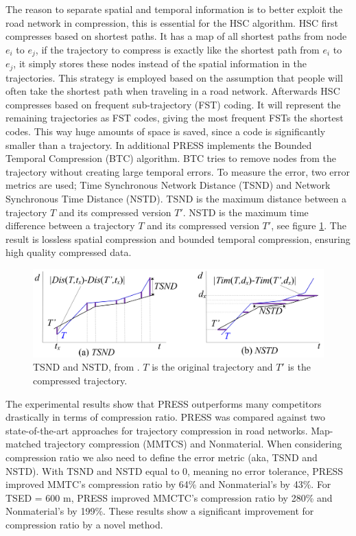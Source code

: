 The reason to separate spatial and temporal information is to better exploit the road network in compression, this is essential for the HSC algorithm. HSC first compresses based on shortest paths. It has a map of all shortest paths from node $e_i$ to $e_j$, if the trajectory to compress is exactly like the shortest path from $e_i$ to $e_j$, it simply stores these nodes instead of the spatial information in the trajectories. This strategy is employed based on the assumption that people will often take the shortest path when traveling in a road network. Afterwards HSC compresses based on frequent sub-trajectory (FST) coding. It will represent the remaining trajectories as FST codes, giving the most frequent FSTs the shortest codes. This way huge amounts of space is saved, since a code is significantly smaller than a trajectory. In additional PRESS implements the Bounded Temporal Compression (BTC) algorithm. BTC tries to remove nodes from the trajectory without creating large temporal errors. To measure the error, two error metrics are used; Time Synchronous Network Distance (TSND) and Network Synchronous Time Distance (NSTD). TSND is the maximum distance between a trajectory $T$ and its compressed version $T'$. NSTD is the maximum time difference between a trajectory $T$ and its compressed version $T'$, see figure \ref{press_error}. The result is lossless spatial compression and bounded temporal compression, ensuring high quality compressed data.

\begin{figure}[t]
    \includegraphics[width=1.0\linewidth]{./figures/press_error.png}
    \caption{TSND and NSTD, from \textcite{song2014press}. $T$ is the original trajectory and $T'$ is the compressed trajectory.}
    \label{press_error}
\end{figure}

The experimental results show that PRESS outperforms many competitors drastically in terms of compression ratio. PRESS was compared against two state-of-the-art approaches for trajectory compression in road networks. Map-matched trajectory compression (MMTCS) and Nonmaterial. When considering compression ratio we also need to define the error metric (aka, TSND and NSTD). With TSND and NSTD equal to 0, meaning no error tolerance, PRESS improved MMTC's compression ratio by 64\% and Nonmaterial's by 43\%. For TSED = 600 m, PRESS improved MMCTC's compression ratio by 280\% and Nonmaterial's by 199\%. These results show a significant improvement for compression ratio by a novel method.

